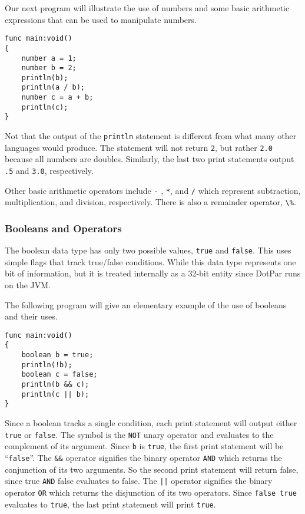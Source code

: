 Our next program will illustrate the use of numbers and some basic arithmetic
expressions that can be used to manipulate numbers.

\begin{verbatim}
func main:void()
{
    number a = 1;
    number b = 2;
    println(b);
    println(a / b);
    number c = a + b;
    println(c);
}
\end{verbatim}

Not that the output of the \verb=println= statement is different from what many
other languages would produce.
The statement will not return \verb=2=, but rather \verb=2.0= because all
numbers are doubles.
Similarly, the last two print statements output \verb=.5= and \verb=3.0=,
respectively.

Other basic arithmetic operators include \verb=-= , \verb=*=, and \verb=/= which
represent subtraction, multiplication, and division, respectively.  There is
also a remainder operator, \verb=\%=.

\subsubsection{Booleans and Operators}
The boolean data type has only two possible values, \verb=true= and
\verb=false=.  This uses simple flags that track true/false conditions. While
this data type represents one bit of information, but it is treated internally
as a 32-bit entity since DotPar runs on the JVM.

The following program will give an elementary example of the use of booleans
and their uses.

\begin{verbatim}
func main:void()
{
    boolean b = true;
    println(!b);
    boolean c = false;
    println(b && c);
    println(c || b);
}
\end{verbatim}

Since a boolean tracks a single condition, each print statement will
output either \verb=true= or \verb=false=.  The \! symbol is the \verb=NOT= unary
operator and evaluates to the complement of its argument.  Since \verb=b= is
\verb=true=, the first print statement will be ``\verb=false=''.  The \verb=&&=
operator signifies the binary operator \verb=AND= which returns the conjunction
of its two arguments.  So the second print statement will return false, since
true \verb=AND= false evaluates to false. The \verb=||= operator signifies the binary
operator \verb=OR= which returns the disjunction of its two operators. 
Since \verb=false true= evaluates to \verb=true=, the last print statement will
print \verb=true=.

